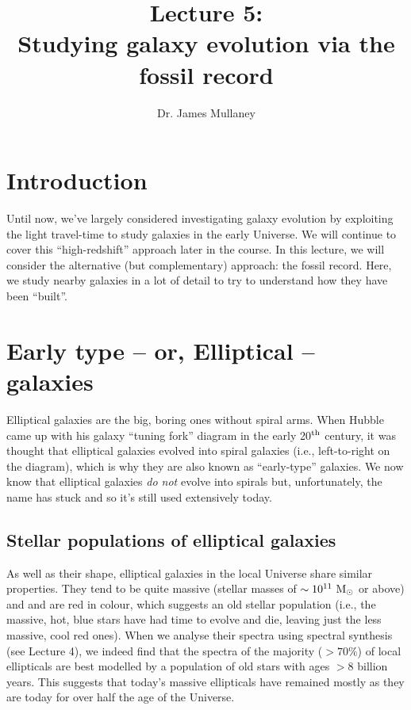 \documentclass[11pt]{article}
\begin{document}
 
\title{Lecture 5:\\Studying galaxy evolution via the fossil record}
\author{Dr. James Mullaney}
\maketitle

\section{Introduction}
Until now, we've largely considered investigating galaxy evolution by
exploiting the light travel-time to study galaxies in the early
Universe. We will continue to cover this ``high-redshift'' approach
later in the course. In this lecture, we will consider the alternative
(but complementary) approach: the fossil record. Here, we study nearby
galaxies in a lot of detail to try to understand how they have been
``built''.

\section{Early type -- or, Elliptical -- galaxies}
Elliptical galaxies are the big, boring ones without spiral arms. When
Hubble came up with his galaxy ``tuning fork'' diagram in the early
20$^{\rm th}$ century, it was thought that elliptical galaxies evolved
into spiral galaxies (i.e., left-to-right on the diagram), which is
why they are also known as ``early-type'' galaxies. We now know that
elliptical galaxies {\it do not} evolve into spirals but,
unfortunately, the name has stuck and so it's still used extensively
today.

\subsection{Stellar populations of elliptical galaxies}
As well as their shape, elliptical galaxies in the local Universe
share similar properties. They tend to be quite massive (stellar
masses of $\sim10^{11}~{\rm M_\odot}$ or above) and and are red in
colour, which suggests an old stellar population (i.e., the massive,
hot, blue stars have had time to evolve and die, leaving just the less
massive, cool red ones). When we analyse their spectra using spectral
synthesis (see Lecture 4), we indeed find that the spectra of the
majority ($>70\%$) of local ellipticals are best modelled by a
population of old stars with ages $>8$ billion years. This suggests
that today's massive ellipticals have remained mostly as they are
today for over half the age of the Universe.
\end{document}
